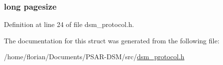\subsubsection[{\texorpdfstring{pagesize}{pagesize}}]{\setlength{\rightskip}{0pt plus 5cm}long pagesize}\hypertarget{structmsg__connect__args__s_a29671842af1d917af8aa77327c489da0}{}\label{structmsg__connect__args__s_a29671842af1d917af8aa77327c489da0}


Definition at line 24 of file dsm\+\_\+protocol.\+h.



The documentation for this struct was generated from the following file\+:\begin{DoxyCompactItemize}
\item 
/home/florian/\+Documents/\+P\+S\+A\+R-\/\+D\+S\+M/src/\hyperlink{dsm__protocol_8h}{dsm\+\_\+protocol.\+h}\end{DoxyCompactItemize}
